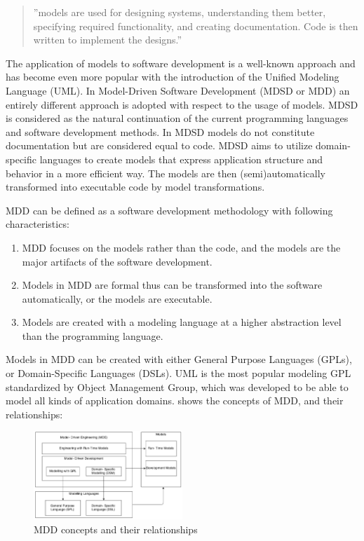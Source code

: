 \begin{quote}
''models are used for designing systems, understanding them better, specifying required functionality, and creating documentation. Code is then written to implement the designs.''\citep{model-stahl-2006}
\end{quote}

The application of models to software development is a well-known approach and has become even more popular with the introduction of the Unified Modeling Language (UML). In Model-Driven Software Development (MDSD or MDD) an entirely different approach is adopted with respect to the usage of models. MDSD is considered as the natural continuation of the current programming languages and software development methods. In MDSD models do not constitute documentation but are considered equal to code. MDSD aims to utilize domain-specific languages to create models that express application structure and behavior in a more efficient way. The models are then (semi)automatically transformed into executable code by model transformations.

MDD can be defined as a software development methodology with following characteristics:
\begin{enumerate}
\item MDD focuses on the models rather than the code, and the
models are the major artifacts of the software development.
\item Models in MDD are formal thus can be transformed into the
software automatically, or the models are executable.
\item Models are created with a modeling language at a higher abstraction level than the programming language.
\end{enumerate}

Models in MDD can be created with either General Purpose Languages (GPLs), or Domain-Specific Languages (DSLs). UML is the most popular modeling GPL standardized by Object Management Group, which was developed to be able to model all kinds of application domains.
 shows the concepts of MDD, and their relationships:

\begin{figure}[!htbp]
\includegraphics[width=0.5\textwidth]{img/MDD-concept.PNG}
\caption{ MDD concepts and their relationships }
\label{fig:mdd-concept}
\end{figure}

